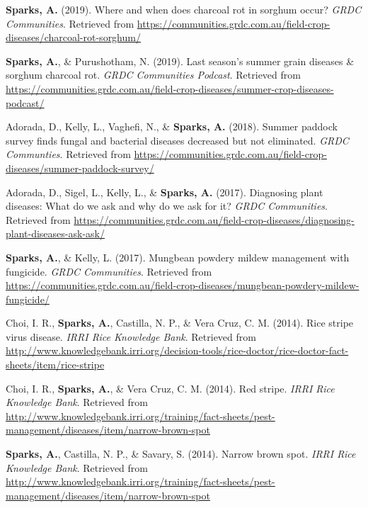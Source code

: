 \documentclass[11pt, a4paper]{awesome-cv}
\begin{document}
\leavevmode\hypertarget{ref-Sparks2019a}{}%
\textbf{Sparks, A.} (2019). Where and when does charcoal rot in sorghum occur? \emph{GRDC Communities}. Retrieved from \url{https://communities.grdc.com.au/field-crop-diseases/charcoal-rot-sorghum/}

\leavevmode\hypertarget{ref-Sparks2019b}{}%
\textbf{Sparks, A.}, \& Purushotham, N. (2019). Last season's summer grain diseases \& sorghum charcoal rot. \emph{GRDC Communities Podcast}. Retrieved from \url{https://communities.grdc.com.au/field-crop-diseases/summer-crop-diseases-podcast/}

\leavevmode\hypertarget{ref-Adorada2019d}{}%
Adorada, D., Kelly, L., Vaghefi, N., \& \textbf{Sparks, A.} (2018). Summer paddock survey finds fungal and bacterial diseases decreased but not eliminated. \emph{GRDC Communties}. Retrieved from \url{https://communities.grdc.com.au/field-crop-diseases/summer-paddock-survey/}

\leavevmode\hypertarget{ref-Adorada2017}{}%
Adorada, D., Sigel, L., Kelly, L., \& \textbf{Sparks, A.} (2017). Diagnosing plant diseases: What do we ask and why do we ask for it? \emph{GRDC Communities}. Retrieved from \url{https://communities.grdc.com.au/field-crop-diseases/diagnosing-plant-diseases-ask-ask/}

\leavevmode\hypertarget{ref-Sparks2017}{}%
\textbf{Sparks, A.}, \& Kelly, L. (2017). Mungbean powdery mildew management with fungicide. \emph{GRDC Communities}. Retrieved from \url{https://communities.grdc.com.au/field-crop-diseases/mungbean-powdery-mildew-fungicide/}

\leavevmode\hypertarget{ref-Choi2014b}{}%
Choi, I. R., \textbf{Sparks, A.}, Castilla, N. P., \& Vera Cruz, C. M. (2014). Rice stripe virus disease. \emph{IRRI Rice Knowledge Bank}. Retrieved from \url{http://www.knowledgebank.irri.org/decision-tools/rice-doctor/rice-doctor-fact-sheets/item/rice-stripe}

\leavevmode\hypertarget{ref-Choi2014}{}%
Choi, I. R., \textbf{Sparks, A.}, \& Vera Cruz, C. M. (2014). Red stripe. \emph{IRRI Rice Knowledge Bank}. Retrieved from \url{http://www.knowledgebank.irri.org/training/fact-sheets/pest-management/diseases/item/narrow-brown-spot}

\leavevmode\hypertarget{ref-Sparks2014f}{}%
\textbf{Sparks, A.}, Castilla, N. P., \& Savary, S. (2014). Narrow brown spot. \emph{IRRI Rice Knowledge Bank}. Retrieved from \url{http://www.knowledgebank.irri.org/training/fact-sheets/pest-management/diseases/item/narrow-brown-spot}
\end{document}
